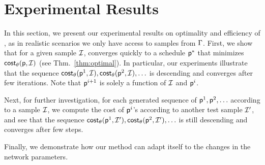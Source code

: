 \section{Experimental Results}\label{sec:exp}
In this section, we present our experimental results on optimality and
efficiency of \algonameapx, as in realistic scenarios we only have access to
samples from $\Gamma$. First, we show that for a given sample $\mathcal{I}$,
\algonameapx 
converges quickly to a schedule $\mathsf{p}^*$ that minimizes $\mathsf{cost}_\theta(\mathsf{p},
\mathcal{I})$ (see Thm.~\ref{thm:optimal}). In particular, our experiments
illustrate that the sequence $\mathsf{cost}_\theta(\mathsf{p}^1,\mathcal{I}), \mathsf{cost}_\theta(\mathsf{p}^2, \mathcal{I}),
\ldots$ is descending and converges after few iterations.  Note that
$\mathsf{p}^{i+1}$ is solely a function of $\mathcal{I}$ and $\mathsf{p}^i$. 


Next, for further investigation, for each generated sequence of
$\mathsf{p}^1,\mathsf{p}^2,\ldots$ according to a sample $\mathcal{I}$, we compute the cost
of $\mathsf{p}^i$'s according to another test sample $\mathcal{I}'$, and see that the
sequence $\mathsf{cost}_\theta(\mathsf{p}^1,\mathcal{I}'), \mathsf{cost}_\theta(\mathsf{p}^2,\mathcal{I}'),\ldots$ is still
descending and converges after few steps.

Finally, we demonstrate how our method can adapt itself to the changes in the network parameters.


